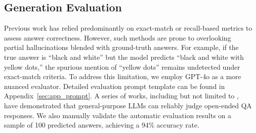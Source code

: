 



\subsection{Generation Evaluation}
\label{sec:eval_gen}

Previous work has relied predominantly on exact-match or recall-based metrics to assess answer correctness. However, such methods are prone to overlooking partial hallucinations blended with ground-truth answers. For example, if the true answer is “black and white” but the model predicts “black and white with yellow dots,” the spurious mention of “yellow dots” remains undetected under exact-match criteria.
To address this limitation, we employ GPT-4o as a more nuanced evaluator. Detailed evaluation prompt template can be found in Appendix~\ref{sec:app_prompt}. A series of works, including but not limited to \citet{kamalloo-etal-2023-evaluating,zheng2023judging,huang2024empiricalstudyllmasajudgellm}, have demonstrated that general-purpose LLMs can reliably judge open-ended QA responses. We also manually validate the automatic evaluation results on a sample of 100 predicted answers, achieving a 94\% accuracy rate. %

